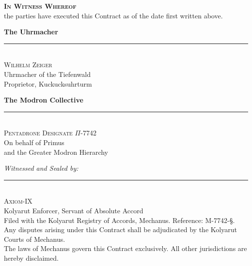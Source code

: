 \documentclass[12pt]{article}
\renewcommand{\footnotesize}{\fontsize{7}{8}\selectfont}
\begin{document}

\newpage

\begin{center}
{\large\bfseries\scshape In Witness Whereof}\\[6pt]
{\normalsize the parties have executed this Contract as of the date
first written above.}
\end{center}

\vspace{24pt}

\begin{minipage}[t]{0.45\textwidth}
\centering
\textbf{The Uhrmacher}\\[30pt]
\rule{0.8\textwidth}{0.4pt}\\[4pt]
\textsc{Wilhelm Zeiger}\\
{\small Uhrmacher of the Tiefenwald\\
Proprietor, Kuckucksuhrturm}
\end{minipage}
\hfill
\begin{minipage}[t]{0.45\textwidth}
\centering
\textbf{The Modron Collective}\\[30pt]
\rule{0.8\textwidth}{0.4pt}\\[4pt]
\textsc{Pentadrone Designate $\Pi$-7742}\\
{\small On behalf of Primus\\
and the Greater Modron Hierarchy}
\end{minipage}

\vspace{24pt}

\begin{center}
\textit{Witnessed and Sealed by:}\\[20pt]
\rule{0.4\textwidth}{0.4pt}\\[4pt]
\textsc{Axiom-IX}\\
{\small Kolyarut Enforcer, Servant of Absolute Accord}\\[6pt]
{\footnotesize Filed with the Kolyarut Registry of Accords,
Mechanus. Reference: M-7742-\S.\\
Any disputes arising under this Contract shall be adjudicated by the
Kolyarut Courts of Mechanus.\\
The laws of Mechanus govern this Contract exclusively.
All other jurisdictions are hereby disclaimed.}
\end{center}
\end{document}
